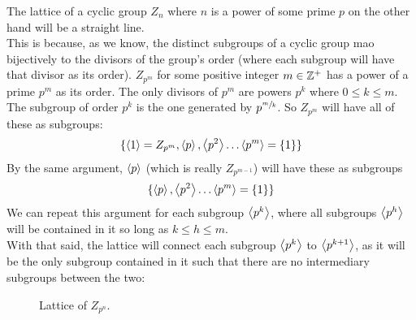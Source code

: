 \documentclass[12pt]{article}
\begin{document}
    The lattice of a cyclic group $Z_n$
    where $n$ is a power of some prime $p$
    on the other hand will be a straight line. \\
    This is because,
    as we know,
    the distinct subgroups of a cyclic group
    mao bijectively to the divisors of the group's order
    (where each subgroup will have that divisor as its order). 
    $Z_{p^m}$ for some positive integer $m \in \mathbb{Z}^+$
    has a power of a prime $p^m$ as its order.
    The only divisors of $p^m$
    are powers $p^k$ where $0 \leqslant k \leqslant m$.
    The subgroup of order $p^k$
    is the one generated by $p^{\sfrac{m}{k}}$.
    So $Z_{p^m}$ will have all of these as subgroups:
    \[ \{ \left\langle 1 \right\rangle = Z_{p^m}, \left\langle p \right\rangle, \left\langle p^2 \right\rangle
    \dots \left\langle p^m \right\rangle = \{1\} \} \]
    By the same argument,
    $\left\langle p \right\rangle$ (which is really $Z_{p^{m-1}}$)
    will have these as subgroups
    \[ \{ \left\langle p \right\rangle, \left\langle p^2 \right\rangle
    \dots \left\langle p^m \right\rangle = \{1\} \} \]
    We can repeat this argument for each subgroup $\left\langle p^k \right\rangle$,
    where all subgroups $\left\langle p^h \right\rangle$ 
    will be contained in it so long as $k \leqslant h \leqslant m$. \\
    With that said,
    the lattice will connect
    each subgroup $\left\langle p^k \right\rangle$ to $\left\langle p^{k+1} \right\rangle$,
    as it will be the only subgroup contained in it
    such that there are no intermediary subgroups between the two:
    \begin{figure}[H]
        \centering
    \caption{\label{fig:figure1} Lattice of $Z_{p^n}$.}
    \end{figure} 
\end{document}
